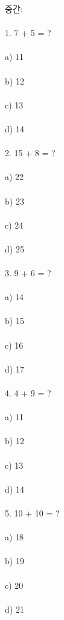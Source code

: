 \documentclass[fleqn]{article}
\begin{document}
중간: \\\\
1. 7 + 5 = ? \\\\
   a) 11 \\\\
   b) 12 \\\\
   c) 13 \\\\
   d) 14 \\\\
  
2. 15 + 8 = ? \\\\
   a) 22 \\\\
   b) 23 \\\\
   c) 24 \\\\
   d) 25 \\\\
  
3. 9 + 6 = ? \\\\
   a) 14 \\\\
   b) 15 \\\\
   c) 16 \\\\
   d) 17 \\\\
  
4. 4 + 9 = ? \\\\
   a) 11 \\\\
   b) 12 \\\\
   c) 13 \\\\
   d) 14 \\\\
  
5. 10 + 10 = ? \\\\
   a) 18 \\\\
   b) 19 \\\\
   c) 20 \\\\
   d) 21 \\\\
  
\end{document}
